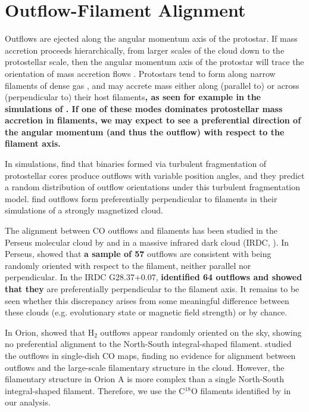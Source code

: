 \documentclass[twocolumn]{aastex63}
\begin{document}
\section{Outflow-Filament Alignment}\label{sec:filaments}
Outflows are ejected along the angular momentum axis of the protostar. If mass accretion proceeds hierarchically, from larger scales of the cloud down to the protostellar scale, then the angular momentum axis of the protostar will trace the orientation of mass accretion flows \citep{Bodenheimer95}. Protostars tend to form along narrow filaments of dense gas \citep{Arzoumanian11}, and may accrete mass either along (parallel to) or across (perpendicular to) their host filaments\textbf{, as seen for example in the simulations of \citet{Li18}. If one of these modes dominates protostellar mass accretion in filaments, we may expect to see a preferential direction of the angular momentum (and thus the outflow) with respect to the filament axis.}

In simulations, \citet{Offner16} find that binaries formed via turbulent fragmentation of protostellar cores produce outflows with variable position angles, and they predict a random distribution of outflow orientations under this turbulent fragmentation model. \citet{Li18} find outflows form preferentially perpendicular to filaments in their simulations of a strongly magnetized cloud. 

The alignment between CO outflows and filaments has been studied in the Perseus molecular cloud by \citet{Stephens17} and in a massive infrared dark cloud (IRDC, \citealp{Kong19}). In Perseus, \citet{Stephens17} showed that \textbf{a sample of 57} outflows are consistent with being randomly oriented with respect to the filament, neither parallel nor perpendicular. In the IRDC G28.37+0.07, \cite{Kong19} \textbf{identified 64 outflows and showed that they} are preferentially perpendicular to the filament axis. It remains to be seen whether this discrepancy arises from some meaningful difference between these clouds (e.g. evolutionary state or magnetic field strength) or by chance.

In Orion, \citet{Davis09} showed that H$_{2}$ outflows appear randomly oriented on the sky, showing no preferential alignment to the North-South integral-shaped filament. \citet{Tanabe19} studied the outflows in single-dish CO maps, finding no evidence for alignment between outflows and the large-scale filamentary structure in the cloud. However, the filamentary structure in Orion A is more complex than a single North-South integral-shaped filament. Therefore, we use the C$^{18}$O filaments identified by \citet{Suri19} in our analysis.
\end{document}
